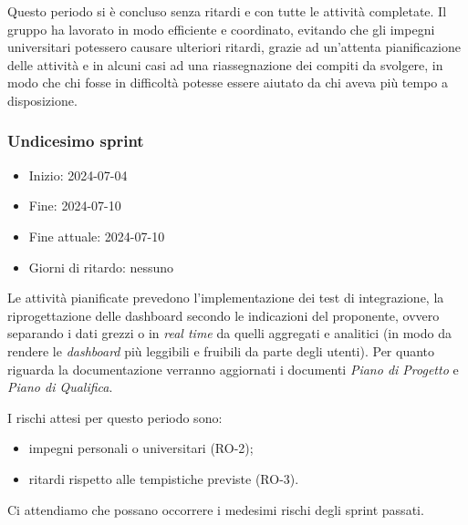 Questo periodo si è concluso senza ritardi e con tutte le attività completate. Il gruppo ha lavorato in modo efficiente e coordinato, evitando che gli impegni universitari potessero causare ulteriori ritardi, grazie ad un'attenta pianificazione delle attività e in alcuni casi ad una riassegnazione dei compiti da svolgere, in modo che chi fosse in difficoltà potesse essere aiutato da chi aveva più tempo a disposizione.


\newpage
\subsubsection{Undicesimo sprint}
\begin{itemize}
    \item Inizio: 2024-07-04
    \item Fine: 2024-07-10
    \item Fine attuale: 2024-07-10
    \item Giorni di ritardo: nessuno
\end{itemize}

Le attività pianificate prevedono l'implementazione dei test di integrazione, la riprogettazione delle dashboard secondo le indicazioni del proponente, ovvero separando i dati grezzi o in \textit{real time} da quelli aggregati e analitici (in modo da rendere le \textit{dashboard} più leggibili e fruibili da parte degli utenti). Per quanto riguarda la documentazione verranno aggiornati i documenti \textit{Piano di Progetto} e \textit{Piano di Qualifica}.

I rischi attesi per questo periodo sono:
\begin{itemize}
    \item impegni personali o universitari (RO-2);
	\item ritardi rispetto alle tempistiche previste (RO-3).
\end{itemize}
Ci attendiamo che possano occorrere i medesimi rischi degli sprint passati.

